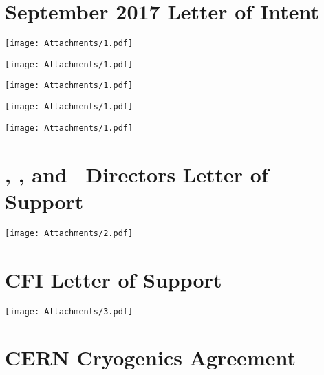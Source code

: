 \onecolumngrid
\appendix

\section{September 2017 Letter of Intent}
\label{sec:LOI}
\begin{figure*}
\texttt{[image: Attachments/1.pdf]}
\end{figure*}
\begin{figure*}
\texttt{[image: Attachments/1.pdf]}
\end{figure*}
\begin{figure*}
\texttt{[image: Attachments/1.pdf]}
\end{figure*}
\begin{figure*}
\texttt{[image: Attachments/1.pdf]}
\end{figure*}
\begin{figure*}
\texttt{[image: Attachments/1.pdf]}
\end{figure*}
\clearpage


\section{\LNGS, \LSC, and \SNOLab\ Directors Letter of Support}
\label{sec:DirectorsLetter}

\begin{figure*}
\texttt{[image: Attachments/2.pdf]}
\end{figure*}
\clearpage


\section{CFI Letter of Support}
\label{sec:CFILetter}

\begin{figure*}
\texttt{[image: Attachments/3.pdf]}
\end{figure*}
\clearpage


\section{CERN Cryogenics Agreement}
\label{sec:CERNCryogenicsAgreement}


